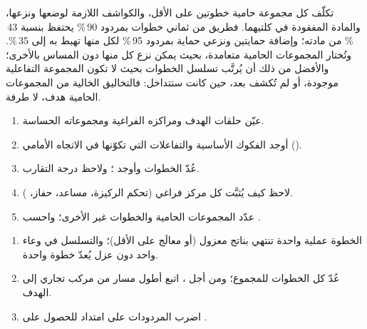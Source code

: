 تكلّف كل مجموعة حامية خطوتين على الأقل، والكواشف اللازمة لوضعها 
ونزعها، والمادة المفقودة في كلتيهما. فطريق من ثماني خطوات بمردود 90\,\% يحتفظ
بنسبة 43\,\% من مادته؛ وإضافة حمايتين ونزعي حماية بمردود 95\,\% لكل منها
تهبط به إلى 35\,\%. وتُختار المجموعات الحامية متعامدة، بحيث يمكن نزع كل منها
دون المساس بالأخرى؛ والأفضل من ذلك أن يُرتَّب تسلسل الخطوات
بحيث لا تكون المجموعة التفاعلية موجودة، أو لم تُكشف بعد، حين
كانت ستتداخل: فالتخاليق الخالية من المجموعات الحامية هدف، لا طرفة.

\begin{method}\label{met:b3:total-synthesis:analyse}
\begin{enumerate}
  \item عيّن حلقات الهدف ومراكزه الفراغية ومجموعاته الحساسة.
  \item أوجد الفكوك الأساسية والتفاعلات التي تكوّنها في الاتجاه
        الأمامي ().
  \item عُدّ الخطوات وأوجد ؛ ولاحظ درجة التقارب.
  \item لاحظ كيف يُثبَّت كل مركز فراغي (تحكم الركيزة، مساعد، حفاز،
        ).
  \item عدّد المجموعات الحامية والخطوات غير  الأخرى؛ واحسب  .
\end{enumerate}
\end{method}

\begin{method}[عدّ الخطوات]\label{met:b3:total-synthesis:count}
\begin{enumerate}
  \item الخطوة عملية واحدة تنتهي بناتج معزول (أو معالَج على الأقل)؛
        والتسلسل في وعاء واحد دون عزل يُعدّ خطوة واحدة.
  \item عُدّ كل الخطوات للمجموع؛ ومن أجل ، اتبع أطول مسار من
        مركب تجاري إلى الهدف.
  \item اضرب المردودات على امتداد  للحصول على .
\end{enumerate}
\end{method}

